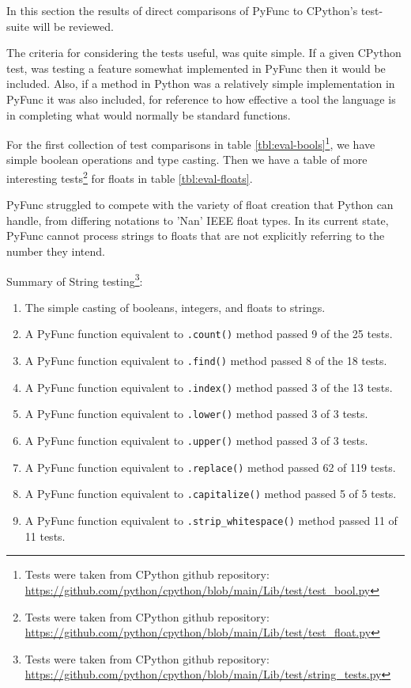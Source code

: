 \documentclass{l4proj}
\begin{document}
In this section the results of direct comparisons of PyFunc to CPython's test-suite will be reviewed.

The criteria for considering the tests useful, was quite simple.
If a given CPython test, was testing a feature somewhat implemented in PyFunc then it would be included.
Also, if a method in Python was a relatively simple implementation in PyFunc it was also included, for reference to how effective a tool the language is in completing what would normally be standard functions.

For the first collection of test comparisons in table \ref{tbl:eval-bools}\footnote{Tests were taken from CPython github repository: \url{https://github.com/python/cpython/blob/main/Lib/test/test_bool.py}}, we have simple boolean operations and type casting.
Then we have a table of more interesting tests\footnote{Tests were taken from CPython github repository: \url{https://github.com/python/cpython/blob/main/Lib/test/test_float.py}} for floats in table \ref{tbl:eval-floats}.

PyFunc struggled to compete with the variety of float creation that Python can handle, from differing notations to 'Nan' IEEE float types.
In its current state, PyFunc cannot process strings to floats that are not explicitly referring to the number they intend. 



    Summary of String testing\footnote{Tests were taken from CPython github repository: \url{https://github.com/python/cpython/blob/main/Lib/test/string_tests.py}}:
    \begin{enumerate}
        \item The simple casting of booleans, integers, and floats to strings.
        \item A PyFunc function equivalent to \texttt{.count()} method passed 9 of the 25 tests.
        \item A PyFunc function equivalent to \texttt{.find()} method passed 8 of the 18 tests.
        \item A PyFunc function equivalent to \texttt{.index()} method passed 3 of the 13 tests.
        \item A PyFunc function equivalent to \texttt{.lower()} method passed 3 of 3 tests.
        \item A PyFunc function equivalent to \texttt{.upper()} method passed 3 of 3 tests.
        \item A PyFunc function equivalent to \texttt{.replace()} method passed 62 of 119 tests.
        \item A PyFunc function equivalent to \texttt{.capitalize()} method passed 5 of 5 tests.
        \item A PyFunc function equivalent to \texttt{.strip\_whitespace()} method passed 11 of 11 tests. 
    \end{enumerate} 
    
\end{document}
